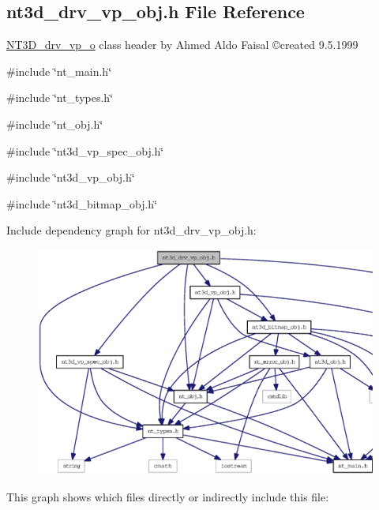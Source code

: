 \subsection{nt3d\_\-drv\_\-vp\_\-obj.h File Reference}
\label{nt3d__drv__vp__obj_8h}



\begin{DoxyItemize}
\item \hyperlink{class_n_t3_d__drv__vp__o}{NT3D\_\-drv\_\-vp\_\-o} class header by Ahmed Aldo Faisal \copyright created 9.5.1999 
\end{DoxyItemize} 


{\ttfamily \#include \char`\"{}nt\_\-main.h\char`\"{}}\par
{\ttfamily \#include \char`\"{}nt\_\-types.h\char`\"{}}\par
{\ttfamily \#include \char`\"{}nt\_\-obj.h\char`\"{}}\par
{\ttfamily \#include \char`\"{}nt3d\_\-vp\_\-spec\_\-obj.h\char`\"{}}\par
{\ttfamily \#include \char`\"{}nt3d\_\-vp\_\-obj.h\char`\"{}}\par
{\ttfamily \#include \char`\"{}nt3d\_\-bitmap\_\-obj.h\char`\"{}}\par
Include dependency graph for nt3d\_\-drv\_\-vp\_\-obj.h:
\nopagebreak
\begin{figure}[H]
\begin{center}
\leavevmode
\includegraphics[width=400pt]{nt3d__drv__vp__obj_8h__incl}
\end{center}
\end{figure}
This graph shows which files directly or indirectly include this file:
